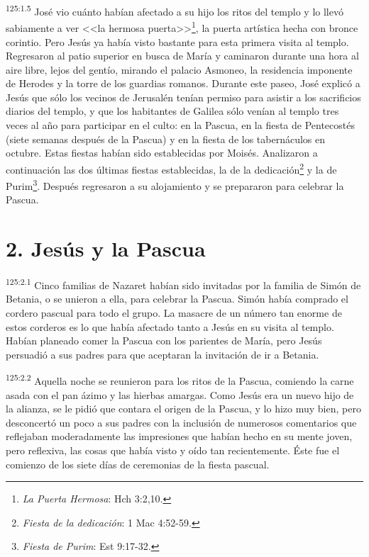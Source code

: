 \par 
\textsuperscript{125:1.5} José vio cuánto habían afectado a su hijo los ritos del templo y lo llevó sabiamente a ver <<la hermosa puerta>>\footnote{\textit{La Puerta Hermosa}: Hch 3:2,10.}, la puerta artística hecha con bronce corintio. Pero Jesús ya había visto bastante para esta primera visita al templo. Regresaron al patio superior en busca de María y caminaron durante una hora al aire libre, lejos del gentío, mirando el palacio Asmoneo, la residencia imponente de Herodes y la torre de los guardias romanos. Durante este paseo, José explicó a Jesús que sólo los vecinos de Jerusalén tenían permiso para asistir a los sacrificios diarios del templo, y que los habitantes de Galilea sólo venían al templo tres veces al año para participar en el culto: en la Pascua, en la fiesta de Pentecostés (siete semanas después de la Pascua) y en la fiesta de los tabernáculos en octubre. Estas fiestas habían sido establecidas por Moisés. Analizaron a continuación las dos últimas fiestas establecidas, la de la dedicación\footnote{\textit{Fiesta de la dedicación}: 1 Mac 4:52-59.} y la de Purim\footnote{\textit{Fiesta de Purim}: Est 9:17-32.}. Después regresaron a su alojamiento y se prepararon para celebrar la Pascua.

\section*{2. Jesús y la Pascua}
\par 
\textsuperscript{125:2.1} Cinco familias de Nazaret habían sido invitadas por la familia de Simón de Betania, o se unieron a ella, para celebrar la Pascua. Simón había comprado el cordero pascual para todo el grupo. La masacre de un número tan enorme de estos corderos es lo que había afectado tanto a Jesús en su visita al templo. Habían planeado comer la Pascua con los parientes de María, pero Jesús persuadió a sus padres para que aceptaran la invitación de ir a Betania.

\par 
\textsuperscript{125:2.2} Aquella noche se reunieron para los ritos de la Pascua, comiendo la carne asada con el pan ázimo y las hierbas amargas. Como Jesús era un nuevo hijo de la alianza, se le pidió que contara el origen de la Pascua, y lo hizo muy bien, pero desconcertó un poco a sus padres con la inclusión de numerosos comentarios que reflejaban moderadamente las impresiones que habían hecho en su mente joven, pero reflexiva, las cosas que había visto y oído tan recientemente. Éste fue el comienzo de los siete días de ceremonias de la fiesta pascual.


